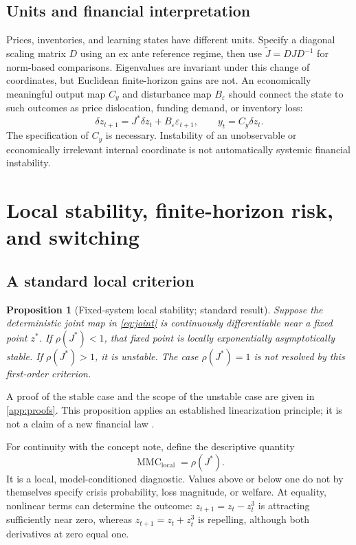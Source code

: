 \documentclass[11pt,a4paper]{article}
\newtheorem{proposition}[theorem]{Proposition}
\theoremstyle{definition}
\theoremstyle{remark}
\newcommand{\MMC}{\operatorname{MMC}}
\begin{document}
\subsection{Units and financial interpretation}
Prices, inventories, and learning states have different units. Specify a diagonal scaling matrix $D$ using an ex ante reference regime, then use $\widetilde J=D J D^{-1}$ for norm-based comparisons. Eigenvalues are invariant under this change of coordinates, but Euclidean finite-horizon gains are not. An economically meaningful output map $C_y$ and disturbance map $B_\varepsilon$ should connect the state to such outcomes as price dislocation, funding demand, or inventory loss:
\begin{equation}
 \delta z_{t+1}=J^*\delta z_t+B_\varepsilon\varepsilon_{t+1},\qquad
 y_t=C_y\delta z_t.
 \label{eq:linear}
\end{equation}
The specification of $C_y$ is necessary. Instability of an unobservable or economically irrelevant internal coordinate is not automatically systemic financial instability.

\section{Local stability, finite-horizon risk, and switching}
\label{sec:stability}
\subsection{A standard local criterion}
\begin{proposition}[Fixed-system local stability; standard result]
\label{prop:local}
Suppose the deterministic joint map in \cref{eq:joint} is continuously differentiable near a fixed point $z^*$. If $\rho(J^*)<1$, that fixed point is locally exponentially asymptotically stable. If $\rho(J^*)>1$, it is unstable. The case $\rho(J^*)=1$ is not resolved by this first-order criterion.
\end{proposition}
A proof of the stable case and the scope of the unstable case are given in \cref{app:proofs}. This proposition applies an established linearization principle; it is not a claim of a new financial law \citep{khalil2002}.

For continuity with the concept note, define the descriptive quantity
\begin{equation}
 \MMC_{\mathrm{local}}=\rho(J^*).
 \label{eq:mmc}
\end{equation}
It is a local, model-conditioned diagnostic. Values above or below one do not by themselves specify crisis probability, loss magnitude, or welfare. At equality, nonlinear terms can determine the outcome: $z_{t+1}=z_t-z_t^3$ is attracting sufficiently near zero, whereas $z_{t+1}=z_t+z_t^3$ is repelling, although both derivatives at zero equal one.
\end{document}
